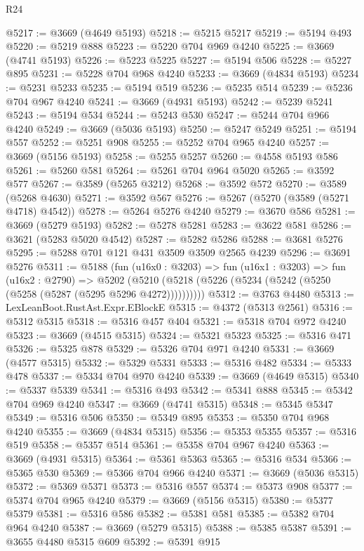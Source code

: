 \begin{lexlean}{R24}
\begin{coremodule}
@5217 := @3669 (@4649 @5193)
@5218 := @5215 @5217
@5219 := @5194 @493
@5220 := @5219 @888
@5223 := @5220 @704 @969 @4240
@5225 := @3669 (@4741 @5193)
@5226 := @5223 @5225
@5227 := @5194 @506
@5228 := @5227 @895
@5231 := @5228 @704 @968 @4240
@5233 := @3669 (@4834 @5193)
@5234 := @5231 @5233
@5235 := @5194 @519
@5236 := @5235 @514
@5239 := @5236 @704 @967 @4240
@5241 := @3669 (@4931 @5193)
@5242 := @5239 @5241
@5243 := @5194 @534
@5244 := @5243 @530
@5247 := @5244 @704 @966 @4240
@5249 := @3669 (@5036 @5193)
@5250 := @5247 @5249
@5251 := @5194 @557
@5252 := @5251 @908
@5255 := @5252 @704 @965 @4240
@5257 := @3669 (@5156 @5193)
@5258 := @5255 @5257
@5260 := @4558 @5193 @586
@5261 := @5260 @581
@5264 := @5261 @704 @964 @5020
@5265 := @3592 @577
@5267 := @3589 (@5265 @3212)
@5268 := @3592 @572
@5270 := @3589 (@5268 @4630)
@5271 := @3592 @567
@5276 := @5267 (@5270 (@3589 (@5271 @4718) @4542))
@5278 := @5264 @5276 @4240
@5279 := @3670 @586
@5281 := @3669 (@5279 @5193)
@5282 := @5278 @5281
@5283 := @3622 @581
@5286 := @3621 (@5283 @5020 @4542)
@5287 := @5282 @5286
@5288 := @3681 @5276
@5295 := @5288 @701 @121 @431 @3509 @3509 @2565 @4239
@5296 := @3691 @5276
@5311 := @5188
    (fun (u16x0 : @3203) =>
    fun (u16x1 : @3203) =>
    fun (u16x2 : @2790) =>
    @5202 (@5210 (@5218 (@5226 (@5234 (@5242 (@5250 (@5258 (@5287 (@5295 @5296 @4272))))))))))
@5312 := @3763 @4480
@5313 := LexLeanBoot.RustAst.Expr.EBlockE
@5315 := @4372 (@5313 @2561)
@5316 := @5312 @5315
@5318 := @5316 @457 @404
@5321 := @5318 @704 @972 @4240
@5323 := @3669 (@4515 @5315)
@5324 := @5321 @5323
@5325 := @5316 @471
@5326 := @5325 @878
@5329 := @5326 @704 @971 @4240
@5331 := @3669 (@4577 @5315)
@5332 := @5329 @5331
@5333 := @5316 @482
@5334 := @5333 @478
@5337 := @5334 @704 @970 @4240
@5339 := @3669 (@4649 @5315)
@5340 := @5337 @5339
@5341 := @5316 @493
@5342 := @5341 @888
@5345 := @5342 @704 @969 @4240
@5347 := @3669 (@4741 @5315)
@5348 := @5345 @5347
@5349 := @5316 @506
@5350 := @5349 @895
@5353 := @5350 @704 @968 @4240
@5355 := @3669 (@4834 @5315)
@5356 := @5353 @5355
@5357 := @5316 @519
@5358 := @5357 @514
@5361 := @5358 @704 @967 @4240
@5363 := @3669 (@4931 @5315)
@5364 := @5361 @5363
@5365 := @5316 @534
@5366 := @5365 @530
@5369 := @5366 @704 @966 @4240
@5371 := @3669 (@5036 @5315)
@5372 := @5369 @5371
@5373 := @5316 @557
@5374 := @5373 @908
@5377 := @5374 @704 @965 @4240
@5379 := @3669 (@5156 @5315)
@5380 := @5377 @5379
@5381 := @5316 @586
@5382 := @5381 @581
@5385 := @5382 @704 @964 @4240
@5387 := @3669 (@5279 @5315)
@5388 := @5385 @5387
@5391 := @3655 @4480 @5315 @609
@5392 := @5391 @915

\end{coremodule}
\end{lexlean}
